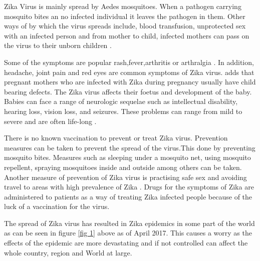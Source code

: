 Zika Virus is mainly spread by Aedes mosquitoes. When a pathogen carrying mosquito bites an no infected individual it leaves the pathogen in them.
Other ways of by which the virus spreads include,
blood transfusion, unprotected sex with an infected person and from mother to child, infected mothers can pass on the virus to their unborn children \citep{musso2014}.

Some of the symptoms are popular rash,fever,arthritis or arthralgia \cite{musso2015}.
In addition, headache, joint pain and red eyes are common symptoms of Zika virus. \cite{simoes2016zika}  adds that pregnant mothers who are infected with Zika during pregnancy usually have child bearing defects.
The Zika virus affects their foetus and development of the baby. Babies can face a range of neurologic sequelae such as intellectual disability, hearing loss, vision loss, and seizures. These problems can range from mild to severe and are often life-long \citep{rasmussen2016zika}.

There is no known vaccination to prevent or treat  Zika virus. Prevention measures can be taken to prevent the spread of the virus.This done by preventing mosquito bites.
Measures such as sleeping under a mosquito net, using mosquito repellent, spraying mosquitoes
inside and outside among others can be taken. Another measure of prevention of Zika virus is practising safe sex and avoiding travel to areas with high prevalence of Zika .
Drugs for the symptoms of Zika are administered to patients as a way of treating Zika infected people because of the luck of a vaccination for the virus.


The spread of Zika virus has resulted in Zika epidemics in some part of the world as can be seen in figure \ref{fig 1} above as of April 2017. This causes a worry as the effects of the epidemic are more devastating and if not controlled can affect the whole country, region and World at large. 


